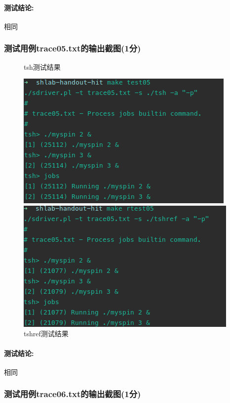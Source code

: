 \paragraph{测试结论:}相同

\subsubsection{测试用例trace05.txt的输出截图(1分)}

\begin{figure}[H]
    \begin{minipage}[c]{0.5\linewidth}
        \centering
        \caption{tsh测试结果}
        \includegraphics[width=0.7\linewidth]{figures/test05.png}
    \end{minipage}
    \begin{minipage}[c]{0.5\linewidth}
        \centering
        \caption{tshref测试结果}
        \includegraphics[width=0.7\linewidth]{figures/rtest05.png}
    \end{minipage}
\end{figure}

\paragraph{测试结论:}相同

\subsubsection{测试用例trace06.txt的输出截图(1分)}

